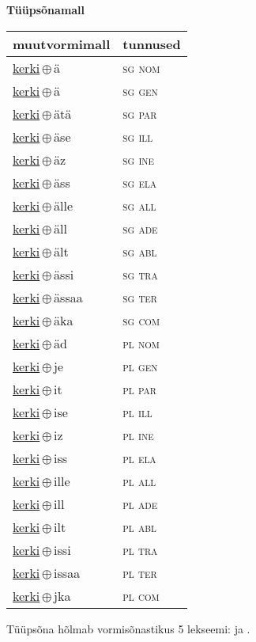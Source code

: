 

\vspace{3.5em}
\noindent \begin{minipage}{\textwidth}
\noindent \textbf{Tüüpsõnamall \,}\\

\begin{sideways}
\begin{tabular}{l l}
muutvormimall & tunnused \\
\hline
\underline{kerki}\,$\oplus$\,ä & \textsc{ sg nom } \\
\underline{kerki}\,$\oplus$\,ä & \textsc{ sg gen } \\
\underline{kerki}\,$\oplus$\,ätä & \textsc{ sg par } \\
\underline{kerki}\,$\oplus$\,äse & \textsc{ sg ill } \\
\underline{kerki}\,$\oplus$\,äz & \textsc{ sg ine } \\
\underline{kerki}\,$\oplus$\,äss & \textsc{ sg ela } \\
\underline{kerki}\,$\oplus$\,älle & \textsc{ sg all } \\
\underline{kerki}\,$\oplus$\,äll & \textsc{ sg ade } \\
\underline{kerki}\,$\oplus$\,ält & \textsc{ sg abl } \\
\underline{kerki}\,$\oplus$\,ässi & \textsc{ sg tra } \\
\underline{kerki}\,$\oplus$\,ässaa & \textsc{ sg ter } \\
\underline{kerki}\,$\oplus$\,äka & \textsc{ sg com } \\
\underline{kerki}\,$\oplus$\,äd & \textsc{ pl nom } \\
\underline{kerki}\,$\oplus$\,je & \textsc{ pl gen } \\
\underline{kerki}\,$\oplus$\,it & \textsc{ pl par } \\
\underline{kerki}\,$\oplus$\,ise & \textsc{ pl ill } \\
\underline{kerki}\,$\oplus$\,iz & \textsc{ pl ine } \\
\underline{kerki}\,$\oplus$\,iss & \textsc{ pl ela } \\
\underline{kerki}\,$\oplus$\,ille & \textsc{ pl all } \\
\underline{kerki}\,$\oplus$\,ill & \textsc{ pl ade } \\
\underline{kerki}\,$\oplus$\,ilt & \textsc{ pl abl } \\
\underline{kerki}\,$\oplus$\,issi & \textsc{ pl tra } \\
\underline{kerki}\,$\oplus$\,issaa & \textsc{ pl ter } \\
\underline{kerki}\,$\oplus$\,jka & \textsc{ pl com } \\
\end{tabular}
\end{sideways}
\label{tab:tüüpsõnamall-kerkiä}

\end{minipage}

 
\vspace{1em}
\noindent Tüüpsõna hõlmab vormisõnastikus 5 lekseemi:  ja .
